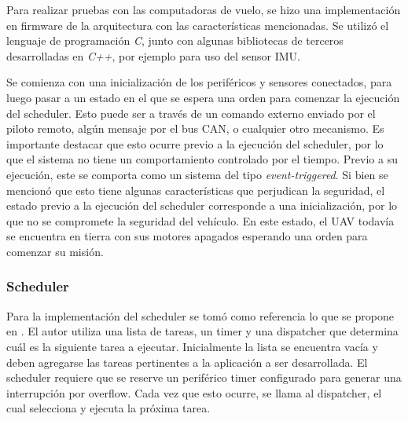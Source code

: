 
Para realizar pruebas con las computadoras de vuelo, se hizo una implementación en firmware de la arquitectura con las características mencionadas. Se utilizó el lenguaje de programación \textit{C}, junto con algunas bibliotecas de terceros desarrolladas en \textit{C++}, por ejemplo para uso del sensor IMU. 


Se comienza con una inicialización de los periféricos y sensores conectados, para luego pasar a un estado en el que se espera una orden para comenzar la ejecución del scheduler. Esto puede ser a través de un comando externo enviado por el piloto remoto, algún mensaje por el bus CAN, o cualquier otro mecanismo.
Es importante destacar que esto ocurre previo a la ejecución del scheduler, por lo que el sistema no tiene un comportamiento controlado por el tiempo. Previo a su ejecución, este se comporta como un sistema del tipo \textit{event-triggered}. Si bien se mencionó que esto tiene algunas características que perjudican la seguridad, el estado previo a la ejecución del scheduler corresponde a una inicialización, por lo que no se compromete la seguridad del vehículo. En este estado, el UAV todavía se encuentra en tierra con sus motores apagados esperando una orden para comenzar su misión.

\subsubsection{Scheduler}


Para la implementación del scheduler se tomó como referencia lo que se propone en \cite{pont2008patterns}. El autor utiliza una lista de tareas, un timer y una dispatcher que determina cuál es la siguiente tarea a ejecutar. Inicialmente la lista se encuentra vacía y deben agregarse las tareas pertinentes a la aplicación a ser desarrollada. El scheduler requiere que se reserve un periférico timer configurado para generar una interrupción por overflow. Cada vez que esto ocurre, se llama al dispatcher, el cual selecciona y ejecuta la próxima tarea.


